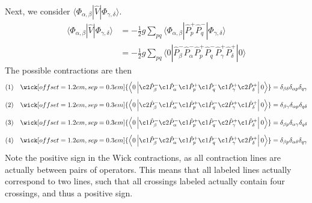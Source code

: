 Next, we consider $\langle \Phi_{\alpha, \beta} | \hat{V} | \Phi_{\gamma, \delta} \rangle$.
\begin{align*}
    \langle \Phi_{\alpha, \beta} | \hat{V} | \Phi_{\gamma, \delta} \rangle
    &= -\frac{1}{2} g \sum_{pq} \langle \Phi_{\alpha, \beta} | \hat{P}_p^+ \hat{P}_q^- | \Phi_{\gamma, \delta} \rangle \\
    &= -\frac{1}{2} g \sum_{pq} \langle 0 | \hat{P}_\beta^- \hat{P}_\alpha^- \hat{P}_p^+ \hat{P}_q^- \hat{P}_\gamma^+ \hat{P}_\delta^+| 0 \rangle
\end{align*}
The possible contractions are then
\begin{align*}
    (1) \quad \wick[offset=1.2em,sep=0.3em]{
        \left\langle 0 \left\vert
        \c2 {\hat{P}_\beta^-}
        \c1 {\hat{P}_\alpha^-}
        \c1 {\hat{P}_p^+}
        \c1 {\hat{P}_q^-}
        \c1 {\hat{P}_\gamma^+}
        \c2 {\hat{P}_\delta^+}
        \right\vert 0 \right\rangle
    } &= \delta_{\beta \delta} \delta_{\alpha p} \delta_{q \gamma} \\[0.5em]
    (2) \quad \wick[offset=1.2em,sep=0.3em]{
        \left\langle 0 \left\vert
        \c2 {\hat{P}_\beta^-}
        \c1 {\hat{P}_\alpha^-}
        \c1 {\hat{P}_p^+}
        \c1 {\hat{P}_q^-}
        \c2 {\hat{P}_\gamma^+}
        \c1 {\hat{P}_\delta^+}
        \right\vert 0 \right\rangle
    } &= \delta_{\beta \gamma} \delta_{\alpha p} \delta_{q \delta} \\[0.5em]
    (3) \quad \wick[offset=1.2em,sep=0.3em]{
        \left\langle 0 \left\vert
        \c1 {\hat{P}_\beta^-}
        \c2 {\hat{P}_\alpha^-}
        \c1 {\hat{P}_p^+}
        \c1 {\hat{P}_q^-}
        \c2 {\hat{P}_\gamma^+}
        \c1 {\hat{P}_\delta^+}
        \right\vert 0 \right\rangle
    } &= \delta_{\beta p} \delta_{\alpha \gamma} \delta_{q \delta} \\[0.5em]
    (4) \quad \wick[offset=1.2em,sep=0.3em]{
        \left\langle 0 \left\vert
        \c1 {\hat{P}_\beta^-}
        \c2 {\hat{P}_\alpha^-}
        \c1 {\hat{P}_p^+}
        \c1 {\hat{P}_q^-}
        \c1 {\hat{P}_\gamma^+}
        \c2 {\hat{P}_\delta^+}
        \right\vert 0 \right\rangle
    } &= \delta_{\beta p} \delta_{\alpha \delta} \delta_{q \gamma}
\end{align*}
Note the positive sign in the Wick contractions, as all contraction lines are actually between pairs of operators.
This means that all labeled lines actually correspond to two lines, such that all crossings labeled actually contain four crossings, and thus a positive sign.

